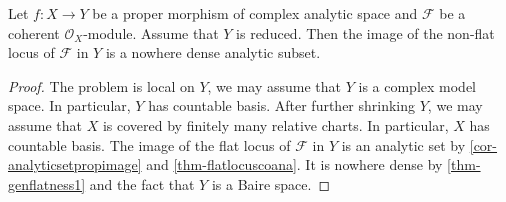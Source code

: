 \begin{corollary}
    Let $f:X\rightarrow Y$ be a proper morphism of complex analytic space and $\mathcal{F}$ be a coherent $\mathcal{O}_X$-module. Assume that $Y$ is reduced. Then the image of the non-flat locus of $\mathcal{F}$ in $Y$ is a nowhere dense analytic subset.
\end{corollary}
\begin{proof}
The problem is local on $Y$, we may assume that $Y$ is a complex model space. In particular, $Y$ has countable basis. After further shrinking $Y$, we may assume that $X$ is covered by finitely many relative charts. In particular, $X$ has countable basis. The image of the flat locus of $\mathcal{F}$ in $Y$ is an analytic set by \cref{cor-analyticsetpropimage} and \cref{thm-flatlocuscoana}. It is nowhere dense by \cref{thm-genflatness1} and the fact that $Y$ is a Baire space. 
\end{proof}



\printbibliography
